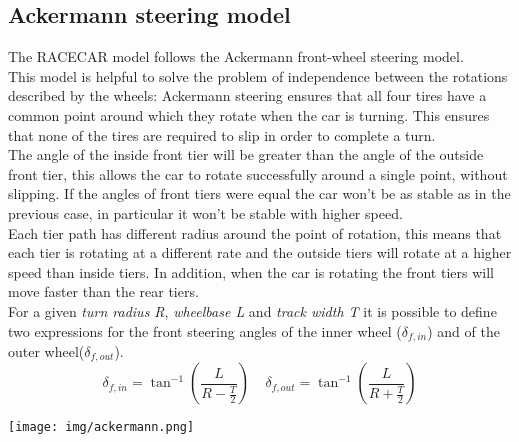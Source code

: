 \subsection{Ackermann steering model}
The RACECAR model follows the Ackermann front-wheel steering model.\\
This model is helpful to solve the problem of independence between the rotations described by the wheels: 
Ackermann steering ensures that all four tires have a common point around which they rotate when the car 
is turning. This ensures that none of the tires are required to slip in order to complete a turn.\\
The angle of the inside front tier will be greater than the angle of the outside front tier, this allows the 
car to rotate successfully around a single point, without slipping. If the angles of front tiers were equal the 
car won't be as stable as in the previous case, in particular it won't be stable with higher speed.\\
Each tier path has different radius around the point of rotation, this means that each tier is rotating at a 
different rate and the outside tiers will rotate at a higher speed than inside tiers. In addition, when the car 
is rotating the front tiers will move faster than the rear tiers. \\
For a given \textit{turn radius R}, \textit{wheelbase L} and \textit{track width T} it is possible to define two 
expressions for the front steering angles of the inner wheel ($\delta_{f,in}$) and of the outer wheel($\delta_{f,out}$).
\begin{equation}
    \delta_{f,in} = \tan^{-1}(\frac{L}{R-\frac{T}{2}}) \ \ \ \ \
    \delta_{f,out} = \tan^{-1}(\frac{L}{R+\frac{T}{2}})
\end{equation}

\texttt{[image: img/ackermann.png]}

